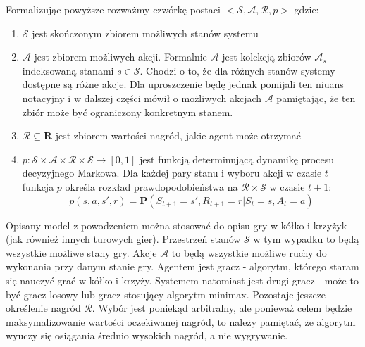 \documentclass[licencjacka]{pracamgr}
\begin{document}
Formalizując powyższe rozważmy czwórkę postaci $<\mathcal{S},\mathcal{A},\mathcal{R},p>$ gdzie:
\begin{enumerate}
 	\item{$\mathcal{S}$ jest skończonym zbiorem możliwych stanów systemu}
	\item{$\mathcal{A}$ jest zbiorem możliwych akcji. Formalnie $\mathcal{A}$ jest kolekcją zbiorów $\mathcal{A}_{s}$ indeksowaną stanami $s\in\mathcal{S}$. Chodzi o to, że dla różnych stanów systemy dostępne są różne akcje.  Dla uproszczenie będę jednak pomijali ten niuans notacyjny i w dalszej części mówił o możliwych akcjach $\mathcal{A}$  pamiętając, że ten zbiór może być ograniczony konkretnym stanem.}
	\item{$\mathcal{R}\subseteq\mathbf{R}$ jest zbiorem wartości nagród, jakie agent może otrzymać}
	\item{$p:\mathcal{S}\times\mathcal{A}\times\mathcal{R}\times\mathcal{S}\rightarrow [0,1]$ jest funkcją determinującą dynamikę procesu decyzyjnego Markowa. Dla każdej pary stanu i wyboru 		akcji w czasie $t$ funkcja $p$ określa rozkład prawdopodobieństwa na $\mathcal{R}\times\mathcal{S}$ w czasie $t+1$:  $$p(s, a, s', r) = \mathbf{P}(S_{t+1}=s', R_{t+1}=r | S_{t}=s, A_{t}=a )$$}
\end{enumerate}

Opisany model z powodzeniem można stosować do opisu gry w kółko i krzyżyk (jak również innych turowych gier). Przestrzeń stanów $\mathcal{S}$ w tym wypadku to będą wszystkie możliwe stany gry. Akcje $\mathcal{A}$ to będą wszystkie możliwe ruchy do wykonania przy danym stanie gry. Agentem jest gracz - algorytm, którego staram się nauczyć grać w kółko i krzyży. Systemem natomiast jest drugi gracz - może to być gracz losowy lub gracz stosujący algorytm minimax. Pozostaje jeszcze określenie nagród $\mathcal{R}$. Wybór jest poniekąd arbitralny, ale ponieważ celem będzie maksymalizowanie wartości oczekiwanej nagród, to należy pamiętać, że algorytm wyuczy się osiągania średnio wysokich nagród, a nie wygrywanie. \\
\end{document}
